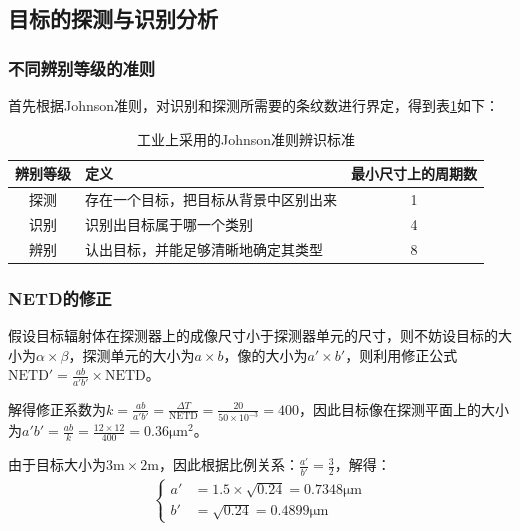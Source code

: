 \documentclass[11pt]{article}
\begin{document}
\subsection{目标的探测与识别分析}
\subsubsection{不同辨别等级的准则}
首先根据Johnson准则，对识别和探测所需要的条纹数进行界定，得到表\ref{table:Johnson准则}如下：
\begin{table}[H]
  \renewcommand{\arraystretch}{1.5}
  \centering
  \caption{工业上采用的Johnson准则辨识标准}
  \label{table:Johnson准则}
  \begin{tabularx}{\textwidth}{|c|>{\centering}X|c|}
    \hline
    辨别等级 & 定义                 & 最小尺寸上的周期数 \\\hline
    探测   & 存在一个目标，把目标从背景中区别出来 & 1         \\\hline
    识别   & 识别出目标属于哪一个类别       & 4         \\\hline
    辨别   & 认出目标，并能足够清晰地确定其类型  & 8         \\\hline
  \end{tabularx}
\end{table}
\subsubsection{NETD的修正}
假设目标辐射体在探测器上的成像尺寸小于探测器单元的尺寸，则不妨设目标的大小为$\alpha\times\beta$，探测单元的大小为$a\times b$，像的大小为$a'\times b'$，则利用修正公式$\displaystyle \mathrm{NETD}'=\frac{ab}{a'b'}\times\mathrm{NETD}$。\par
解得修正系数为$\displaystyle k=\frac{ab}{a'b'}=\frac{\Delta T}{\mathrm{NETD}}=\frac{20}{50\times10^{-3}}=400$，因此目标像在探测平面上的大小为$\displaystyle a'b'=\frac{ab}{k}=\frac{12\times12}{400}=0.36\unit{\um^2}$。\par
由于目标大小为$3\unit{\m}\times2\unit{\m}$，因此根据比例关系：$\displaystyle\frac{a'}{b'}=\frac{3}{2}$，解得：
\begin{align*}
  \left\{
  \begin{aligned}
    a' & =1.5\times\sqrt{0.24}=0.7348\unit{\um} \\
    b' & =\sqrt{0.24}=0.4899\unit{\um}
  \end{aligned}
  \right.
\end{align*}
\end{document}

